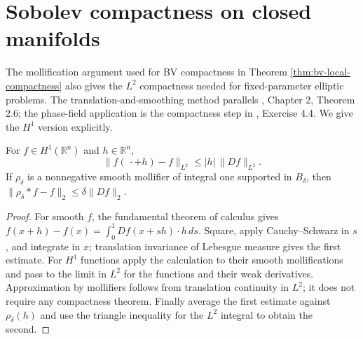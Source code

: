 \chapter{Sobolev compactness on closed manifolds}\label{sec:sobolev-closed-compactness}
The mollification argument used for BV compactness in Theorem \ref{thm:bv-local-compactness} also gives the $L^2$ compactness needed for fixed-parameter elliptic problems. The translation-and-smoothing method parallels \cite{Sim18}, Chapter 2, Theorem 2.6; the phase-field application is the compactness step in \cite{ChAC}, Exercise 4.4. We give the $H^1$ version explicitly.

\begin{lemma}\label{lem:sobolev-l2-translations}
For $f\in H^1(\mathbb R^n)$ and $h\in\mathbb R^n$,
\[
 \|f(\,\cdot+h)-f\|_{L^2}\leq |h|\,\|Df\|_{L^2}.
\]
If $\rho_\delta$ is a nonnegative smooth mollifier of integral one supported in $B_\delta$, then
$\|\rho_\delta*f-f\|_2\leq\delta\|Df\|_2$.
\end{lemma}
\begin{proof}
For smooth $f$, the fundamental theorem of calculus gives
$f(x+h)-f(x)=\int_0^1 Df(x+sh)\cdot h\,ds$.
Square, apply Cauchy--Schwarz in $s$, and integrate in $x$; translation invariance of Lebesgue measure gives the first estimate. For $H^1$ functions apply the calculation to their smooth mollifications and pass to the limit in $L^2$ for the functions and their weak derivatives. Approximation by mollifiers follows from translation continuity in $L^2$; it does not require any compactness theorem. Finally average the first estimate against $\rho_\delta(h)$ and use the triangle inequality for the $L^2$ integral to obtain the second.
\end{proof}

